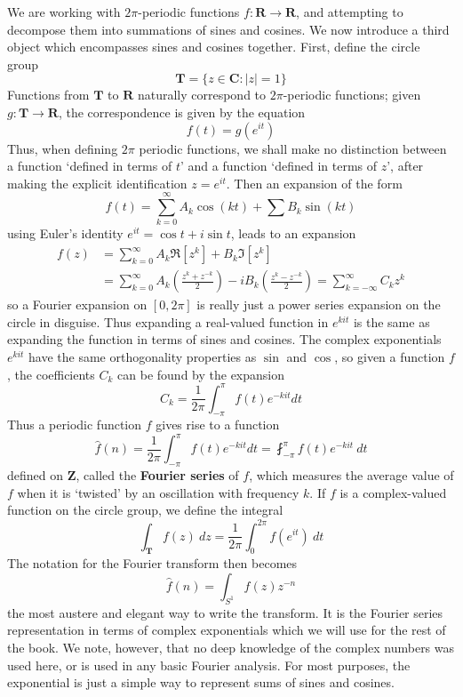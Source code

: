 We are working with $2 \pi$-periodic functions $f: \mathbf{R} \to \mathbf{R}$, and attempting to decompose them into summations of sines and cosines. We now introduce a third object which encompasses sines and cosines together. First, define the circle group
%
\[ \mathbf{T} = \{ z \in \mathbf{C} : |z| = 1 \} \]
%
Functions from $\mathbf{T}$ to $\mathbf{R}$ naturally correspond to $2 \pi$-periodic functions; given $g: \mathbf{T} \to \mathbf{R}$, the correspondence is given by the equation
%
\[ f(t) = g(e^{it}) \]
%
Thus, when defining $2\pi$ periodic functions, we shall make no distinction between a function `defined in terms of $t$' and a function `defined in terms of $z$', after making the explicit identification $z = e^{it}$. Then an expansion of the form
%
\[ f(t) = \sum_{k = 0}^\infty A_k \cos(kt) + \sum B_k \sin(kt) \]
%
using Euler's identity $e^{it} = \cos t + i \sin t$, leads to an expansion
%
\begin{align*}
    f(z) &= \sum_{k = 0}^\infty A_k \Re[z^k] + B_k \Im[z^k]\\
    &= \sum_{k = 0}^\infty A_k \left( \frac{z^k + z^{-k}}{2} \right) - i B_k \left( \frac{z^k - z^{-k}}{2} \right) = \sum_{k = -\infty}^\infty C_k z^k
\end{align*}
%
so a Fourier expansion on $[0,2\pi]$ is really just a power series expansion on the circle in disguise. Thus expanding a real-valued function in $e^{kit}$ is the same as expanding the function in terms of sines and cosines. The complex exponentials $e^{kit}$ have the same orthogonality properties as $\sin$ and $\cos$, so given a function $f$, the coefficients $C_k$ can be found by the expansion
%
\[ C_k = \frac{1}{2\pi} \int_{-\pi}^\pi f(t) e^{-kit} dt \]
%
Thus a periodic function $f$ gives rise to a function
%
\[ \widehat{f}(n) = \frac{1}{2\pi} \int_{-\pi}^\pi f(t) e^{-kit} dt = \fint_{-\pi}^\pi f(t) e^{-kit}\ dt \]
%
defined on $\mathbf{Z}$, called the {\bf Fourier series} of $f$, which measures the average value of $f$ when it is `twisted' by an oscillation with frequency $k$. If $f$ is a complex-valued function on the circle group, we define the integral
%
\[ \int_{\mathbf{T}} f(z)\ dz = \frac{1}{2\pi} \int_0^{2\pi} f(e^{it})\ dt \]
%
The notation for the Fourier transform then becomes
%
\[ \widehat{f}(n) = \int_{S^1} f(z) z^{-n} \]
%
the most austere and elegant way to write the transform. It is the Fourier series representation in terms of complex exponentials which we will use for the rest of the book. We note, however, that no deep knowledge of the complex numbers was used here, or is used in any basic Fourier analysis. For most purposes, the exponential is just a simple way to represent sums of sines and cosines.

